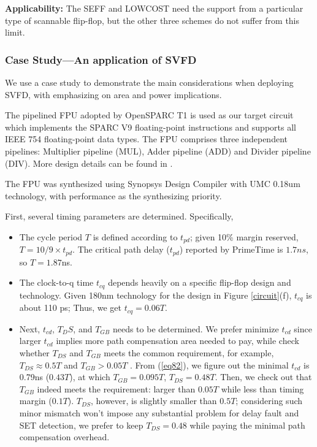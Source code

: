 {\bf Applicability:} The SEFF and LOWCOST need the support from a particular type of scannable flip-flop, but the other three schemes do not suffer from this limit.

\subsubsection{Case Study---An application of SVFD}

We use a case study to demonstrate the main considerations when deploying SVFD, with emphasizing on area and power implications.

The pipelined FPU adopted by OpenSPARC T1 \cite{OpenSPARC_06} is used as our target circuit which implements the SPARC V9 floating-point instructions and supports all IEEE 754 floating-point data types. The FPU comprises three independent pipelines: Multiplier pipeline (MUL), Adder pipeline (ADD) and Divider pipeline (DIV). More design details can be found in \cite{OpenSPARC_06}.

The FPU was synthesized using Synopsys Design Compiler with UMC 0.18um technology, with performance as the synthesizing priority.

\vspace{0.3cm} 

First, several timing parameters are determined. Specifically,
\begin{itemize}
  \item The cycle period $T$ is defined according to $t_{pd}$; given 10\% margin reserved,   $T={10}/{9}\times t_{pd}$. The critical path delay ($t_{pd}$) reported by PrimeTime is $1.7ns$, so $T=1.87$ns.

  \item The clock-to-q time $t_{cq}$ depends heavily on a specific flip-flop design and technology. Given 180nm technology for the design in Figure \ref{circuit}(f),  $t_{cq}$ is about 110 ps; Thus, we get $t_{cq} = 0.06T$.

  \item  Next, $t_{cd}$, $T_DS$, and $T_{GB}$ needs to be determined. We prefer minimize $t_{cd}$ since larger $t_{cd}$ implies more path compensation area needed to pay, while check whether $T_{DS}$ and $T_{GB}$ meets the common requirement, for example, $T_{DS}\approx0.5T$ and $T_{GB}>0.05T$ \cite{lowcost_date07} \cite{agarwal2007circuit}. From (\ref{eq82}), we figure out the minimal $t_{cd}$ is 0.79ns ($0.43T$), at which $T_{GB}=0.095T$, $T_{DS}=0.48T$. Then, we check out that $T_{GB}$ indeed meets the requirement: larger than $0.05T$ while less than timing margin ($0.1T$). $T_{DS}$, however, is slightly smaller than $0.5T$; considering such minor mismatch won't impose any substantial problem for delay fault and SET detection, we prefer to keep $T_{DS}=0.48$ while paying the minimal path compensation overhead.
\end{itemize}

